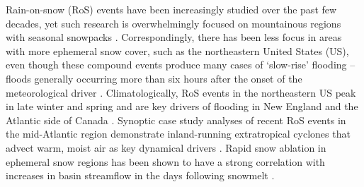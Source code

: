 \documentclass[nhess, manuscript]{copernicus}
\begin{document}

%
%
%
%


\introduction

Rain-on-snow (RoS) events have been increasingly studied over the past few decades, yet such research is overwhelmingly focused on mountainous regions with seasonal snowpacks \citep{singh1997hydrological,mccabe2007rain,wayand2015modeling,sterle2019hydroclimate,musselman2018projected,poschlod2020climate,Hatchett2021,siirila2021a,heggli2022toward,yu2022diverse,brandt2022a,maina2023diverging,haleakala2023watershed}.
Correspondingly, there has been less focus in areas with more ephemeral snow cover, such as the northeastern United States (US), even though these compound events produce many cases of `slow-rise' flooding -- floods generally occurring more than six hours after the onset of the meteorological driver \citep{dougherty2021high}.
Climatologically, RoS events in the northeastern US peak in late winter and spring \citep{ashley2008flood,villarini2010flood,dougherty2019climatology,wachowicz2020rain} and are key drivers of flooding in New England and the Atlantic side of Canada \citep{collins2014annual}.
Synoptic case study analyses of recent RoS events in the mid-Atlantic region demonstrate inland-running extratropical cyclones that advect warm, moist air as key dynamical drivers \citep{grote2021synoptic}.
Rapid snow ablation in ephemeral snow regions has been shown to have a strong correlation with increases in basin streamflow in the days following snowmelt \citep{suriano2020discharge}.
\end{document}
